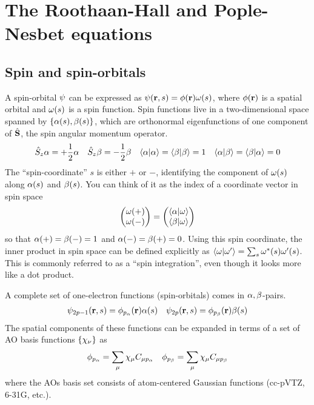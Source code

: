 \documentclass[11pt]{article}
\numberwithin{equation}{section}
\begin{document}
\setlength{\abovedisplayskip}{3pt}
\setlength{\belowdisplayskip}{3pt}

\setcounter{section}{1}
\section{The Roothaan-Hall and Pople-Nesbet equations}

\subsection{Spin and spin-orbitals}


A spin-orbital $\psi $ can be expressed as $\psi (\mathbf{r},s)=\phi (\mathbf{r})\omega (s)$, where $\phi (\mathbf{r})$ is a spatial orbital and $\omega (s)$ is a spin function.
Spin functions live in a two-dimensional space spanned by $\{\alpha (s),\beta (s)\}$, which are orthonormal eigenfunctions of one component of $\hat{\mathbf{S}}$, the spin angular momentum operator.
\begin{align}
  \hat{S}_z\alpha 
=
  +\frac {1}{2}\alpha 
&&
  \hat{S}_z\beta 
=
  -\frac {1}{2}\beta 
&&
  \langle\alpha |\alpha \rangle=\langle\beta |\beta \rangle=1
&&
  \langle\alpha |\beta \rangle=\langle\beta |\alpha \rangle=0
\end{align}
The ``spin-coordinate'' $s$ is either $+$ or $-$, identifying the component of $\omega (s)$ along $\alpha (s)$ and $\beta (s)$.
You can think of it as the index of a coordinate vector in spin space
\begin{align*}
  \ma{\w(+)\\\w(-)}
=
  \ma{\ip{\a|\w}\\\ip{\b|\w}}
\end{align*}
so that $\alpha (+)=\beta (-)=1$ and $\alpha (-)=\beta (+)=0$.
Using this spin coordinate, the inner product in spin space can be defined explicitly as $\langle\omega |\omega '\rangle=\sum_s\omega ^*(s)\omega '(s)$.
This is commonly referred to as a ``spin integration'', even though it looks more like a dot product.

A complete set of one-electron functions (spin-orbitals) comes in $\alpha ,\beta $-pairs.
\begin{align}\label{eq:spin-orb-general}
	\psi _{2p-1}(\mathbf{r},s)
=
  \phi _{p_{\alpha }}(\mathbf{r})\alpha (s)
&&
  \psi _{2p}(\mathbf{r},s)
=
  \phi _{p_{\beta }}(\mathbf{r})\beta (s)
\end{align}
The spatial components of these functions can be expanded in terms of a set of AO basis functions $\{\x_\nu\}$ as
\begin{align}\label{eq:space-orb}
  \f_{p_\a}
=
  \sum_\mu \x_\mu C_{\mu p_\a}
&&
  \f_{p_\b}
=
  \sum_\mu \x_\mu C_{\mu p_\b}
\end{align}
where the AOs basis set consists of atom-centered Gaussian functions (cc-pVTZ, 6-31G, etc.).
\end{document}
